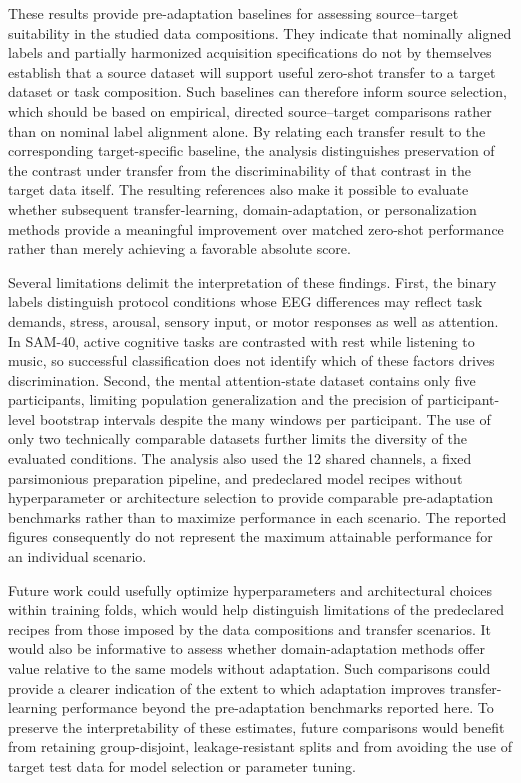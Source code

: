 \documentclass[10pt,letterpaper]{article}
\begin{document}
\medskip

These results provide pre-adaptation baselines for assessing
source--target suitability in the studied data compositions. They indicate that
nominally aligned labels and partially harmonized acquisition specifications do
not by themselves establish that a source dataset will support useful zero-shot
transfer to a target dataset or task composition. Such baselines can therefore
inform source selection, which should be based on empirical, directed
source--target comparisons rather than on nominal label alignment alone. By
relating each transfer result to the corresponding target-specific baseline,
the analysis distinguishes preservation of the contrast under transfer from
the discriminability of that contrast in the target data itself. The resulting
references also make it possible to evaluate whether subsequent
transfer-learning, domain-adaptation, or personalization methods provide a
meaningful improvement over matched zero-shot performance rather than merely
achieving a favorable absolute score.

\medskip

Several limitations delimit the interpretation of these findings. First, the
binary labels distinguish protocol conditions whose EEG differences may
reflect task demands, stress, arousal, sensory input, or motor responses as
well as attention. In SAM-40, active cognitive tasks are contrasted with rest
while listening to music, so successful classification does not identify
which of these factors drives discrimination. Second, the mental
attention-state dataset contains only five participants, limiting population
generalization and the precision of participant-level bootstrap intervals
despite the many windows per participant. The use of only two technically
comparable datasets further limits the diversity of the evaluated conditions. The analysis also used the 12 shared
channels, a fixed parsimonious preparation pipeline, and predeclared model
recipes without hyperparameter or architecture selection to provide comparable
pre-adaptation benchmarks rather than to maximize performance in each
scenario. The reported figures consequently do not represent the maximum
attainable performance for an individual scenario.

\medskip

Future work could usefully optimize hyperparameters and architectural choices
within training folds, which would help distinguish limitations of the
predeclared recipes from those imposed by the data compositions and transfer
scenarios. It would also be informative to assess whether domain-adaptation
methods offer value relative to the same models without adaptation. Such
comparisons could provide a clearer indication of the extent to which
adaptation improves transfer-learning performance beyond the pre-adaptation
benchmarks reported here. To preserve the interpretability of these estimates,
future comparisons would benefit from retaining group-disjoint,
leakage-resistant splits and from avoiding the use of target test data for
model selection or parameter tuning.
\end{document}
